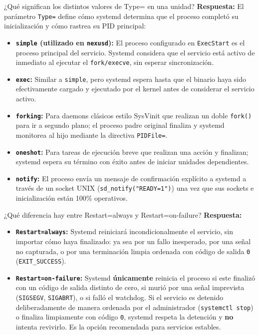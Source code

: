 \documentclass[10pt,a4paper]{article}
\begin{document}
\begin{pregunta}{¿Qué significan los distintos valores de Type= en una unidad?}
    \textbf{Respuesta:} El parámetro \texttt{Type=} define cómo systemd determina que el proceso completó su inicialización y cómo rastrea su PID principal:
    \begin{itemize}[leftmargin=*]
        \item \textbf{\texttt{simple} (utilizado en \texttt{nexusd}):} El proceso configurado en \texttt{ExecStart} es el proceso principal del servicio. Systemd considera que el servicio está activo de inmediato al ejecutar el \texttt{fork/execve}, sin esperar sincronización.
        \item \textbf{\texttt{exec}:} Similar a \texttt{simple}, pero systemd espera hasta que el binario haya sido efectivamente cargado y ejecutado por el kernel antes de considerar el servicio activo.
        \item \textbf{\texttt{forking}:} Para daemons clásicos estilo SysVinit que realizan un doble \texttt{fork()} para ir a segundo plano; el proceso padre original finaliza y systemd monitorea al hijo mediante la directiva \texttt{PIDFile=}.
        \item \textbf{\texttt{oneshot}:} Para tareas de ejecución breve que realizan una acción y finalizan; systemd espera su término con éxito antes de iniciar unidades dependientes.
        \item \textbf{\texttt{notify}:} El proceso envía un mensaje de confirmación explícito a systemd a través de un socket UNIX (\texttt{sd\_notify("READY=1")}) una vez que sus sockets e inicialización están 100\% operativos.
    \end{itemize}
\end{pregunta}

\begin{pregunta}{¿Qué diferencia hay entre Restart=always y Restart=on-failure?}
    \textbf{Respuesta:}
    \begin{itemize}[leftmargin=*]
        \item \textbf{\texttt{Restart=always}:} Systemd reiniciará incondicionalmente el servicio, sin importar cómo haya finalizado: ya sea por un fallo inesperado, por una señal no capturada, o por una terminación limpia ordenada con código de salida \texttt{0} (\texttt{EXIT\_SUCCESS}).
        \item \textbf{\texttt{Restart=on-failure}:} Systemd \textbf{únicamente} reinicia el proceso si este finalizó con un código de salida distinto de cero, si murió por una señal imprevista (\texttt{SIGSEGV}, \texttt{SIGABRT}), o si falló el watchdog. Si el servicio es detenido deliberadamente de manera ordenada por el administrador (\texttt{systemctl stop}) o finaliza limpiamente con código \texttt{0}, systemd respeta la detención y \textbf{no} intenta revivirlo. Es la opción recomendada para servicios estables.
    \end{itemize}
\end{pregunta}
\end{document}
